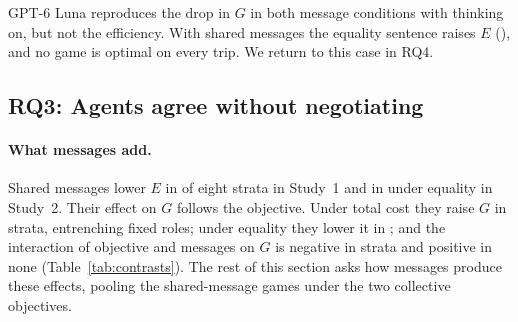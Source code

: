 \documentclass[11pt]{article}
\begin{document}
GPT-6 Luna reproduces the drop in $G$ in both message conditions with thinking on, but not the efficiency. With shared messages the equality sentence raises $E$ (\LunaFairTextEOn), and no game is optimal on every trip. We return to this case in RQ4.

\begin{table}[t]
\centering\small
\resizebox{\columnwidth}{!}{}
\caption{Games that are optimal on every trip (SO), split into fixed and rotating roles. Each cell has 128 planned games for the open models (64 per mode) and 64 for Luna (32 per mode).}
\label{tab:regimes}
\end{table}

\subsection{RQ3: Agents agree without negotiating}
\paragraph{What messages add.}
Shared messages lower $E$ in \SOneTextE{} of eight strata in Study~1 and in \TextFairE{} under equality in Study~2. Their effect on $G$ follows the objective. Under total cost they raise $G$ in \TextSocGInc{} strata, entrenching fixed roles; under equality they lower it in \TextFairG; and the interaction of objective and messages on $G$ is negative in \InterG{} strata and positive in none (Table~\ref{tab:contrasts}). The rest of this section asks how messages produce these effects, pooling the \ProcGames{} shared-message games under the two collective objectives.
\end{document}
